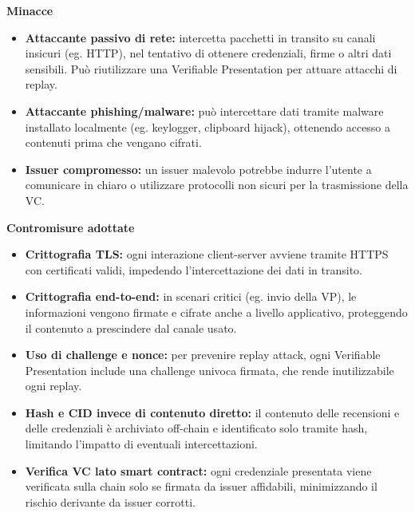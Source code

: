             \noindent \textbf{Minacce}
                \begin{itemize}
                    \item \textbf{Attaccante passivo di rete:} intercetta pacchetti in transito su canali insicuri (eg. HTTP), nel tentativo di ottenere credenziali, firme o altri dati sensibili. Può riutilizzare una Verifiable Presentation per attuare attacchi di replay.
                    
                    \item \textbf{Attaccante phishing/malware:} può intercettare dati tramite malware installato localmente (eg. keylogger, clipboard hijack), ottenendo accesso a contenuti prima che vengano cifrati.
                    
                    \item \textbf{Issuer compromesso:} un issuer malevolo potrebbe indurre l'utente a comunicare in chiaro o utilizzare protocolli non sicuri per la trasmissione della VC.
                \end{itemize}
    
            \noindent \textbf{Contromisure adottate}
                \begin{itemize}
                    \item \textbf{Crittografia TLS:} ogni interazione client-server avviene tramite HTTPS con certificati validi, impedendo l'intercettazione dei dati in transito.
                    
                    \item \textbf{Crittografia end-to-end:} in scenari critici (eg. invio della VP), le informazioni vengono firmate e cifrate anche a livello applicativo, proteggendo il contenuto a prescindere dal canale usato.
                    
                    \item \textbf{Uso di challenge e nonce:} per prevenire replay attack, ogni Verifiable Presentation include una challenge univoca firmata, che rende inutilizzabile ogni replay.
                    
                    \item \textbf{Hash e CID invece di contenuto diretto:} il contenuto delle recensioni e delle credenziali è archiviato off-chain e identificato solo tramite hash, limitando l'impatto di eventuali intercettazioni.
                    
                    \item \textbf{Verifica VC lato smart contract:} ogni credenziale presentata viene verificata sulla chain solo se firmata da issuer affidabili, minimizzando il rischio derivante da issuer corrotti.
                \end{itemize}

